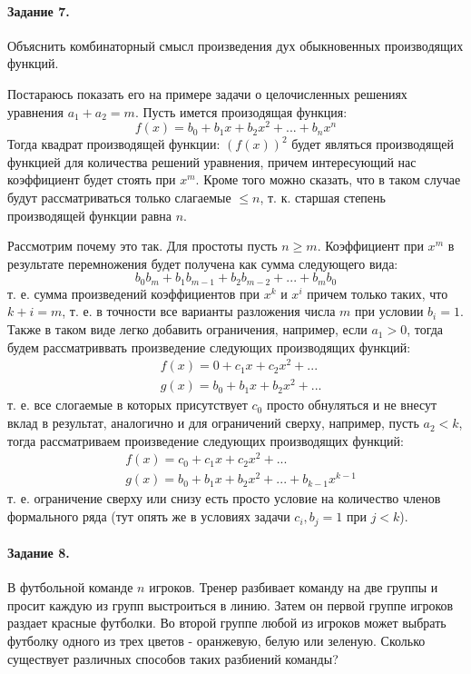 \documentclass[a4paper,12pt]{article}
\begin{document}
\paragraph{Задание 7.} Объяснить комбинаторный смысл произведения дух обыкновенных производящих функций.

\begin{Solution}
Постараюсь показать его на примере задачи о целочисленных решениях уравнения $a_1 + a_2 = m$. Пусть имется произодящая функция:
\[
	f\left(x\right) = b_0 + b_1 x + b_2 x^2 + ... + b_n x^n
\]
Тогда квадрат производящей функции: ${\left(f\left(x\right)\right)}^2$ будет являться производящей функцией для количества решений уравнения, причем интересующий нас коэффициент будет стоять при $x^m$. Кроме того можно сказать, что в таком случае будут рассматриваться только слагаемые $\le n$, т. к. старшая степень производящей функции равна $n$.

Рассмотрим почему это так. Для простоты пусть $n \ge m$. Коэффициент при $x^m$ в результате перемножения будет получена как сумма следующего вида:
\[
	b_0 b_m + b_1 b_{m-1} + b_2 b_{m-2} + ... + b_m b_0
\]
т. е. сумма произведений коэффициентов при $x^k$ и $x^i$ причем только таких, что $k+i=m$, т. е. в точности все варианты разложения числа $m$ при условии $b_i = 1$. Также в таком виде легко добавить ограничения, например, если $a_1 > 0$, тогда будем рассматриввать произведение следующих производящих функций:
\[
	\begin{split}
		& f\left(x\right) = 0 + c_1 x + c_2 x^2 + ... \\
		& g\left(x\right) = b_0 + b_1 x + b_2 x^2 + ...
	\end{split}
\]
т. е. все слогаемые в которых присутствует $c_0$ просто обнуляться и не внесут вклад в результат, аналогично и для ограничений сверху, например, пусть $a_2 < k$, тогда рассматриваем произведение следующих производящих функций:
\[
	\begin{split}
		& f\left(x\right) = c_0 + c_1 x + c_2 x^2 + ... \\
		& g\left(x\right) = b_0 + b_1 x + b_2 x^2 + ... + b_{k-1} x^{k-1}
	\end{split}
\]
т. е. ограничение сверху или снизу есть просто условие на количество членов формального ряда (тут опять же в условиях задачи $c_i,b_j = 1$ при $j<k$).
\end{Solution}

\paragraph{Задание 8.} В футбольной команде $n$ игроков. Тренер разбивает команду на две группы и просит каждую из групп выстроиться в линию. Затем он первой группе игроков раздает красные футболки. Во второй группе любой из игроков может выбрать футболку одного из трех цветов - оранжевую, белую или зеленую. Сколько существует различных способов таких разбиений команды?
\end{document}
